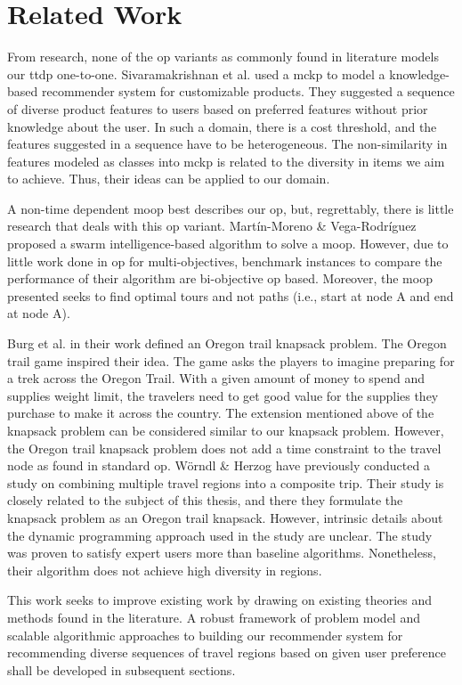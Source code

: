 \section{Related Work}
From research, none of the \gls{op} variants as commonly found in literature models our \gls{ttdp} one-to-one. Sivaramakrishnan et al.\parencite{MCKP_CustomProducts} used a \gls{mckp} to model a knowledge-based recommender system for customizable products. They suggested a sequence of diverse product features to users based on preferred features without prior knowledge about the user. In such a domain, there is a cost threshold, and the features suggested in a sequence have to be heterogeneous. The non-similarity in features modeled as classes into \gls{mckp} is related to the diversity in items we aim to achieve. Thus, their ideas can be applied to our domain. 

A non-time dependent \gls{moop} best describes our \gls{op}, but, regrettably, there is little research that deals with this \gls{op} variant. Martín-Moreno \& Vega-Rodríguez\parencite{Martin-Moreno2018Multi-ObjectiveProblem} proposed a swarm intelligence-based algorithm to solve a \gls{moop}. However, due to little work done in \gls{op} for multi-objectives, benchmark instances to compare the performance of their algorithm are bi-objective \gls{op} based. Moreover, the \gls{moop} presented seeks to find optimal tours and not paths (i.e., start at node A and end at node A).

Burg et al.\parencite{Oregon_Trail_Knapsack} in their work defined an Oregon trail knapsack problem. The Oregon trail game inspired their idea. The game asks the players to imagine preparing for a trek across the Oregon Trail. With a given amount of money to spend and supplies weight limit, the travelers need to get good value for the supplies they purchase to make it across the country. The extension mentioned above of the knapsack problem can be considered similar to our knapsack problem. However, the Oregon trail knapsack problem does not add a time constraint to the travel node as found in standard \gls{op}. Wörndl \& Herzog\parencite{cbrecsys2014} have previously conducted a study on combining multiple travel regions into a composite trip. Their study is closely related to the subject of this thesis, and there they formulate the knapsack problem as an Oregon trail knapsack. However, intrinsic details about the dynamic programming approach used in the study are unclear. The study was proven to satisfy expert users more than baseline algorithms. Nonetheless, their algorithm does not achieve high diversity in regions\parencite{cbrecsys2014}.

This work seeks to improve existing work by drawing on existing theories and methods found in the literature. A robust framework of problem model and scalable algorithmic approaches to building our recommender system for recommending diverse sequences of travel regions based on given user preference shall be developed in subsequent sections.
